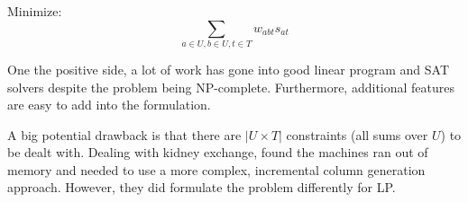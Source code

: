 \documentclass[main.tex]{subfiles}
\begin{document}
Minimize:
  $$\sum_{a \in U, b \in U, t \in T} w_{abt} s_{at}$$

One the positive side, a lot of work has gone into good linear program and SAT solvers despite the problem being NP-complete. Furthermore, additional features are easy to add into the formulation.

A big potential drawback is that there are $|U \times T|$ constraints (all sums over $U$) to be dealt with. Dealing with kidney exchange, \cite{Abr1} found the machines ran out of memory and needed to use a more complex, incremental column generation approach. However, they did formulate the problem differently for LP.
\end{document}
